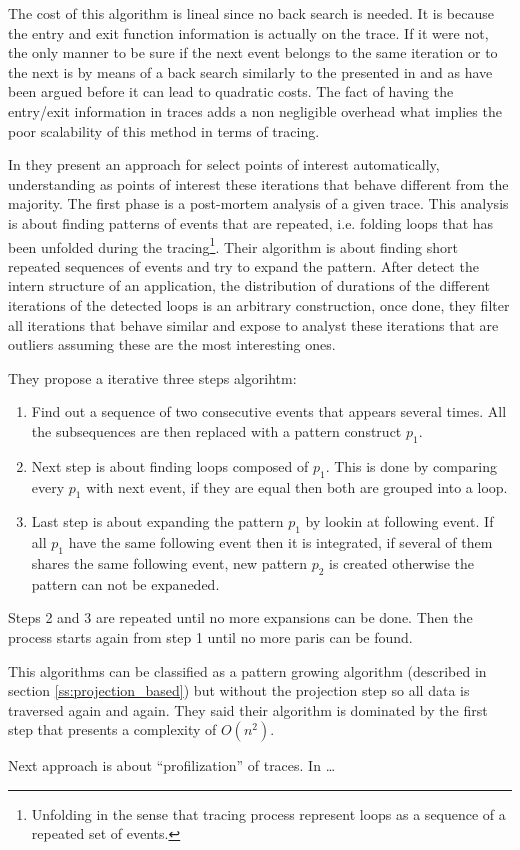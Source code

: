 The cost of this algorithm is lineal since no back search is needed. It is
because the entry and exit function information is actually on the trace. If it
were not, the only manner to be sure if the next event belongs to the same
iteration or to the next is by means of a back search similarly to the presented
in \cite{noeth2009scalatrace} and as have been argued before it can lead to
quadratic costs. The fact of having the entry/exit information in traces adds a
non negligible overhead what implies the poor scalability of this
method in terms of tracing.


In \cite{trahay2015selecting} they present an approach for select points of
interest automatically, understanding as points of interest these iterations that
behave different from the majority. The first phase is a post-mortem analysis of
a given trace. This analysis is about finding patterns of events that are
repeated, i.e. folding loops that has been unfolded during the
tracing\footnote{Unfolding in the sense that tracing process represent loops as
a sequence of a repeated set of events.}. Their algorithm is about finding short
repeated sequences of events and try to expand the pattern. After detect the
intern structure of an application, the distribution of durations of the
different iterations of the detected loops is an arbitrary construction, once
done, they filter all iterations that behave similar and
expose to analyst these iterations that are outliers assuming these are the
most interesting ones.

They propose a iterative three steps algorihtm:
\begin{enumerate}[label=\roman*)]
  \item Find out a sequence of two consecutive events that appears several
    times. All the subsequences are then replaced with a pattern construct
    $p_{1}$.
  \item Next step is about finding loops composed of $p_{1}$. This is done by
    comparing every $p_{1}$ with next event, if they are equal then both are
    grouped into a loop.
  \item Last step is about expanding the pattern $p_{1}$ by lookin at following
    event. If all $p_{1}$ have the same following event then it is integrated,
    if several of them shares the same following event, new pattern $p_{2}$ is
    created otherwise the pattern can not be expaneded.
\end{enumerate}
Steps 2 and 3 are repeated until no more expansions can be done. Then the
process starts again from step 1 until no more paris can be found.

This algorithms can be classified as a pattern growing algorithm (described in
section \ref{ss:projection_based}) but without the projection step so all data
is traversed again and again. They said their algorithm is dominated by the
first step that presents a complexity of $O(n^2)$.

Next approach is about “profilization” of traces.
In \cite{saviankou2015cube} 
\dots


